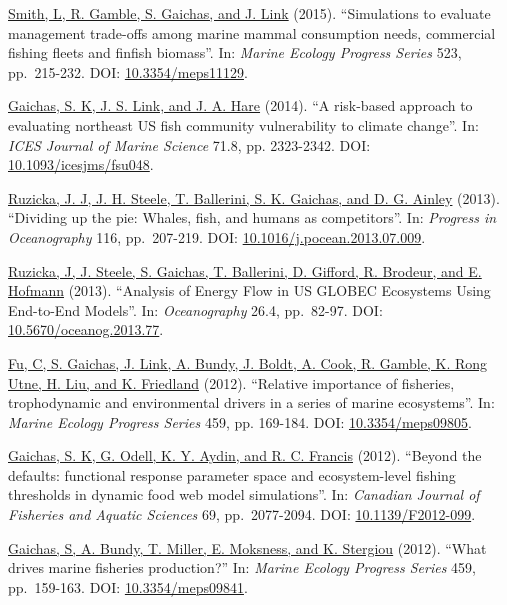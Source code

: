 \documentclass[11pt, a4paper]{awesome-cv}
\begin{document}
\protect\hyperlink{cite-smith_simulations_2015}{Smith, L, R. Gamble, S.
Gaichas, and J. Link} (2015).
``Simulations to evaluate management trade-offs among marine mammal
consumption needs, commercial fishing fleets and finfish biomass''. In:
\emph{Marine Ecology Progress Series} 523, pp.~215-232. DOI:
\href{https://doi.org/10.3354\%2Fmeps11129}{10.3354/meps11129}.

\protect\hyperlink{cite-gaichas_risk-based_2014}{Gaichas, S. K, J. S. Link, and
J. A. Hare} (2014). ``A risk-based
approach to evaluating northeast US fish community vulnerability to
climate change''. In: \emph{ICES Journal of Marine Science} 71.8, pp.
2323-2342. DOI:
\href{https://doi.org/10.1093\%2Ficesjms\%2Ffsu048}{10.1093/icesjms/fsu048}.

\protect\hyperlink{cite-ruzicka_dividing_2013}{Ruzicka, J. J, J. H. Steele, T.
Ballerini, S. K. Gaichas, and D. G.
Ainley} (2013). ``Dividing up the pie:
Whales, fish, and humans as competitors''. In: \emph{Progress in
Oceanography} 116, pp.~207-219. DOI:
\href{https://doi.org/10.1016\%2Fj.pocean.2013.07.009}{10.1016/j.pocean.2013.07.009}.

\protect\hyperlink{cite-ruzicka_analysis_2013}{Ruzicka, J, J. Steele, S.
Gaichas, T. Ballerini, D. Gifford, R. Brodeur, and E.
Hofmann} (2013). ``Analysis of Energy Flow
in US GLOBEC Ecosystems Using End-to-End Models''. In: \emph{Oceanography}
26.4, pp.~82-97. DOI:
\href{https://doi.org/10.5670\%2Foceanog.2013.77}{10.5670/oceanog.2013.77}.

\protect\hyperlink{cite-fu_relative_2012}{Fu, C, S. Gaichas, J. Link, A. Bundy,
J. Boldt, A. Cook, R. Gamble, K. Rong Utne, H. Liu, and K.
Friedland} (2012). ``Relative importance of
fisheries, trophodynamic and environmental drivers in a series of
marine ecosystems''. In: \emph{Marine Ecology Progress Series} 459, pp.
169-184. DOI: \href{https://doi.org/10.3354\%2Fmeps09805}{10.3354/meps09805}.

\protect\hyperlink{cite-gaichas_beyond_2012}{Gaichas, S. K, G. Odell, K. Y.
Aydin, and R. C. Francis} (2012). ``Beyond
the defaults: functional response parameter space and ecosystem-level
fishing thresholds in dynamic food web model simulations''. In:
\emph{Canadian Journal of Fisheries and Aquatic Sciences} 69, pp.~2077-2094.
DOI: \href{https://doi.org/10.1139\%2FF2012-099}{10.1139/F2012-099}.

\protect\hyperlink{cite-gaichas_what_2012}{Gaichas, S, A. Bundy, T. Miller, E.
Moksness, and K. Stergiou} (2012). ``What
drives marine fisheries production?'' In: \emph{Marine Ecology Progress
Series} 459, pp.~159-163. DOI:
\href{https://doi.org/10.3354\%2Fmeps09841}{10.3354/meps09841}.
\end{document}
